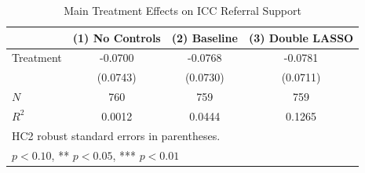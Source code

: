 \begin{table}[htbp]
\centering
\caption{Main Treatment Effects on ICC Referral Support}
\label{tab:main}
\begin{tabular}{lccc}
\hline\hline
 & (1) No Controls & (2) Baseline & (3) Double LASSO \\
\hline
Treatment & -0.0700 & -0.0768 & -0.0781 \\
 & (0.0743) & (0.0730) & (0.0711) \\
\hline
$N$ & 760 & 759 & 759 \\
$R^2$ & 0.0012 & 0.0444 & 0.1265 \\
\hline\hline
\multicolumn{4}{l}{\footnotesize HC2 robust standard errors in parentheses.} \\
\multicolumn{4}{l}{\footnotesize * $p<0.10$, ** $p<0.05$, *** $p<0.01$} \\
\end{tabular}
\end{table}
